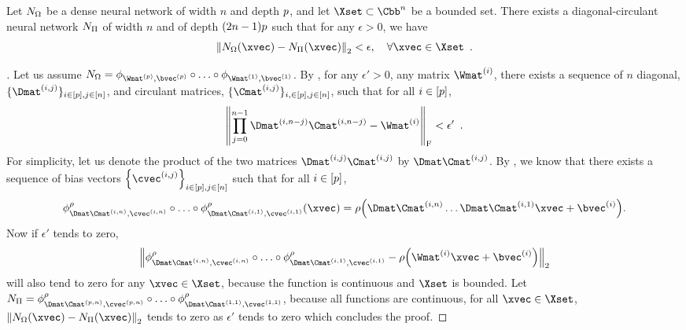 \begin{lemma} \label{lemma:ch4-dcnn_approx_neural_network}
  Let $N_\Omega$ be a dense neural network of width $n$ and depth $p$,
  and let $\Xset \subset \Cbb^n$ be a bounded set.
  There exists a diagonal-circulant neural network $N_\Pi$ of width $n$ and of depth $(2n-1)p$ such that for any $\epsilon > 0$, we have
  \begin{equation}
    \norm{\nn_\Omega(\xvec) - \nn_\Pi(\xvec)}_2 < \epsilon, \quad \forall \xvec \in \Xset \enspace.
  \end{equation}
  \removespace
\end{lemma}

\begin{proof}[]
  Let us assume $\nn_\Omega = \layer_{\Wmat^{(\depth)}, \bvec^{(\depth)}} \circ \ldots \circ \layer_{\Wmat^{(1)}, \bvec^{(1)}}$.
  By , for any $\epsilon' > 0$, any matrix $\Wmat^{(i)}$, there exists a sequence of $n$ diagonal, $\{\Dmat^{(i, j)}\}_{i \in [\depth], j \in [n]}$, and circulant matrices, $\{\Cmat^{(i, j)}\}_{i, \in [\depth], j \in [n]}$, such that for all $i \in [p]$,
  \begin{equation}
    \norm{\prod_{j=0}^{n-1} \Dmat^{(i,n-j)} \Cmat^{(i,n-j)} - \Wmat^{(i)}}_\fro < \epsilon' \enspace.
  \end{equation}
  For simplicity, let us denote the product of the two matrices $\Dmat^{(i,j)} \Cmat^{(i,j)}$ by $\Dmat\Cmat^{(i,j)}$.
  By , we know that there exists a sequence of bias vectors $\left\{ \cvec^{(i,j)} \right\}_{i \in [\depth], j \in [n]}$ such that for all $i\in[p]$, 
  \begin{equation}
    \layer^\act_{\Dmat\Cmat^{(i, n)}, \cvec^{(i, n)}} \circ \ldots \circ \layer^\act_{\Dmat\Cmat^{(i, 1)}, \cvec^{(i, 1)}}(\xvec) = \act \left(\Dmat\Cmat^{(i,n)} \ldots \Dmat\Cmat^{(i,1)} \xvec + \bvec^{(i)} \right).
  \end{equation}
  Now if $\epsilon'$ tends to zero,
  \begin{equation}
    \norm{ \layer^\act_{\Dmat\Cmat^{(i,n)},\cvec^{(i,n)}} \circ \ldots \circ \layer^\act_{\Dmat\Cmat^{(i,1)}, \cvec^{(i,1)}} - \act \left(\Wmat^{(i)} \xvec + \bvec^{(i)} \right)}_2
  \end{equation}
  will also tend to zero for any $\xvec \in \Xset$, because the \relu function is continuous and $\Xset$ is bounded.
  Let $\nn_\Pi = \layer^\act_{\Dmat\Cmat^{(\depth,n)},\cvec^{(\depth,n)}} \circ \ldots \circ \layer^\act_{\Dmat\Cmat^{(1,1)}, \cvec^{(1,1)}}$, because all functions are continuous, for all $\xvec \in \Xset$, $\norm{\nn_\Omega(\xvec) - \nn_\Pi(\xvec)}_2$ tends to zero as $\epsilon'$ tends to zero which concludes the proof.
\end{proof}


